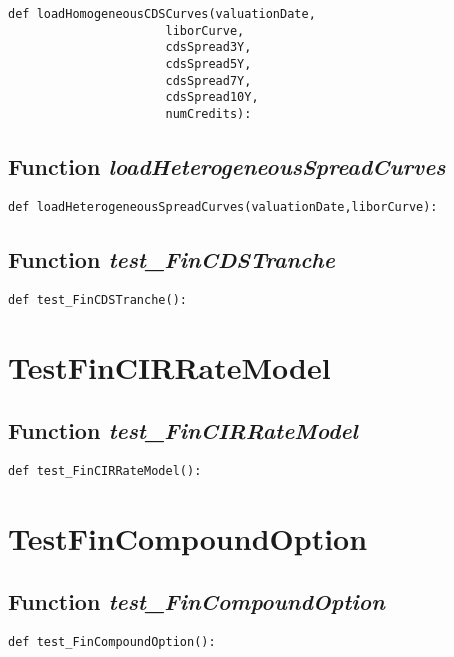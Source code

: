 \documentclass[twoside,11pt]{book}
\begin{document}
\begin{lstlisting}
def loadHomogeneousCDSCurves(valuationDate,
                      liborCurve,
                      cdsSpread3Y,
                      cdsSpread5Y,
                      cdsSpread7Y,
                      cdsSpread10Y,
                      numCredits):
\end{lstlisting}

\subsection{Function {\it loadHeterogeneousSpreadCurves}}


\begin{lstlisting}
def loadHeterogeneousSpreadCurves(valuationDate,liborCurve):
\end{lstlisting}

\subsection{Function {\it test\_FinCDSTranche}}


\begin{lstlisting}
def test_FinCDSTranche():
\end{lstlisting}


\newpage
\section{TestFinCIRRateModel}

\subsection{Function {\it test\_FinCIRRateModel}}


\begin{lstlisting}
def test_FinCIRRateModel():
\end{lstlisting}


\newpage
\section{TestFinCompoundOption}

\subsection{Function {\it test\_FinCompoundOption}}


\begin{lstlisting}
def test_FinCompoundOption():
\end{lstlisting}
\end{document}
